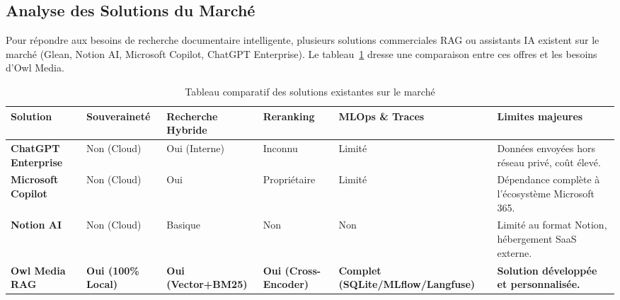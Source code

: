 \subsection{Analyse des Solutions du Marché}
Pour répondre aux besoins de recherche documentaire intelligente, plusieurs solutions commerciales RAG ou assistants IA existent sur le marché (Glean, Notion AI, Microsoft Copilot, ChatGPT Enterprise). Le tableau~\ref{tab:comparatif_existant} dresse une comparaison entre ces offres et les besoins d'Owl Media.

\begin{table}[htbp]
\centering
\small
\caption{Tableau comparatif des solutions existantes sur le marché}
\label{tab:comparatif_existant}
\begin{tabular}{|p{2.2cm}|p{1.8cm}|p{2.0cm}|p{1.6cm}|p{2.2cm}|p{3.2cm}|}
\hline
\textbf{Solution} & \textbf{Souveraineté} & \textbf{Recherche Hybride} & \textbf{Reranking} & \textbf{MLOps \& Traces} & \textbf{Limites majeures} \\ \hline
\textbf{ChatGPT Enterprise} & Non (Cloud) & Oui (Interne) & Inconnu & Limité & Données envoyées hors réseau privé, coût élevé. \\ \hline
\textbf{Microsoft Copilot} & Non (Cloud) & Oui & Propriétaire & Limité & Dépendance complète à l'écosystème Microsoft 365. \\ \hline
\textbf{Notion AI} & Non (Cloud) & Basique & Non & Non & Limité au format Notion, hébergement SaaS externe. \\ \hline
\textbf{Owl Media RAG} & \textbf{Oui (100\% Local)} & \textbf{Oui (Vector+BM25)} & \textbf{Oui (Cross-Encoder)} & \textbf{Complet (SQLite/MLflow/Langfuse)} & \textbf{Solution développée et personnalisée.} \\ \hline
\end{tabular}
\end{table}

